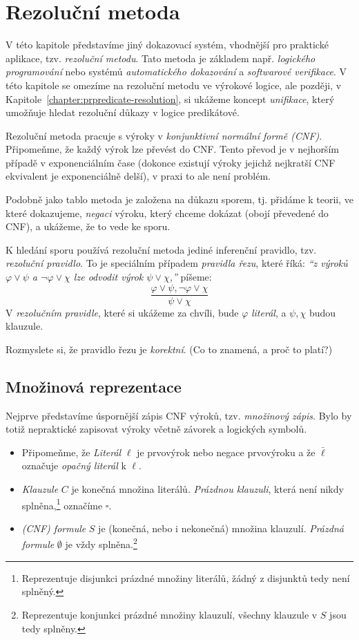\chapter{Rezoluční metoda}\label{chapter:propositional-resolution}

V této kapitole představíme jiný dokazovací systém, vhodnější pro praktické aplikace,  tzv. \emph{rezoluční metodu}. Tato metoda je základem např. \emph{logického programování} nebo systémů \emph{automatického dokazování} a \emph{softwarové verifikace}. V této kapitole se omezíme na rezoluční metodu ve výrokové logice, ale později, v Kapitole~\ref{chapter:prpredicate-resolution}, si ukážeme koncept \emph{unifikace}, který umožňuje hledat rezoluční důkazy v logice predikátové.

Rezoluční metoda pracuje s výroky v \emph{konjunktivní normální formě (CNF)}. Připomeňme, že každý výrok lze převést do CNF. Tento převod je v nejhorším případě v exponenciálním čase (dokonce existují výroky jejichž nejkratší CNF ekvivalent je exponenciálně delší), v praxi to ale není problém.

Podobně jako tablo metoda je založena na důkazu sporem, tj. přidáme k teorii, ve které dokazujeme, \emph{negaci} výroku, který chceme dokázat (obojí převedené do CNF), a ukážeme, že to vede ke sporu.

K hledání sporu používá rezoluční metoda jediné inferenční pravidlo, tzv. \emph{rezoluční pravidlo}. To je speciálním případem \emph{pravidla řezu}, které říká: \emph{``z výroků $\varphi\lor\psi$ a $\neg\varphi\lor\chi$ lze odvodit výrok $\psi\lor\chi$,''} píšeme:
$$
\frac{\varphi\lor\psi,\neg\varphi\lor\chi}{\psi\lor\chi}
$$
V \emph{rezolučním pravidle}, které si ukážeme za chvíli, bude $\varphi$ \emph{literál}, a $\psi,\chi$ budou {klauzule}. 

\begin{exercise}
Rozmyslete si, že pravidlo řezu je \emph{korektní}. (Co to znamená, a proč to platí?)
\end{exercise}

\section{Množinová reprezentace}

Nejprve představíme úspornější zápis CNF výroků, tzv. \emph{množinový zápis}. Bylo by totiž nepraktické zapisovat výroky včetně závorek a logických symbolů.
\begin{itemize}
    \item Připomeňme, že \emph{Literál} $\ell$ je prvovýrok nebo negace prvovýroku  a že $\bar \ell$ označuje \emph{opačný literál} k $\ell$.
    \item \emph{Klauzule} $C$ je konečná množina literálů. \emph{Prázdnou klauzuli}, která není nikdy splněna,\footnote{Reprezentuje disjunkci prázdné množiny literálů, žádný z disjunktů tedy není splněný.} označíme $\square$.
    \item \emph{(CNF) formule} $S$ je (konečná, nebo i nekonečná) množina klauzulí. \emph{Prázdná formule} $\emptyset$ je vždy splněna.\footnote{Reprezentuje konjunkci prázdné množiny klauzulí, všechny klauzule v $S$ jsou tedy splněny.}
\end{itemize}

